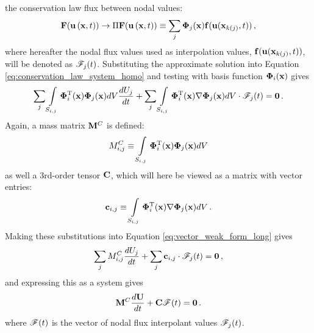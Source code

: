 the conservation law flux between nodal values:
\begin{equation}
  \consfluxvector(\vectorsolution\xt) \rightarrow
  \Pi\consfluxvector(\vectorsolution\xt) 
    \equiv \sumj\vectortestfunction_j(\x)\mathbf{\consfluxletter}
      (\vectorsolution(\x_{\nodeindex(j)},\timevalue))
  \eqc
\end{equation}
where hereafter the nodal flux values used as interpolation values,
$\mathbf{f}(\mathbf{u}(\mathbf{x}_{k(j)},t))$,
will be denoted as $\mathscr{F}_j(t)$.
Substituting the approximate
solution into Equation \eqref{eq:conservation_law_system_homo} and testing with basis
function $\mathbf{\Phi}_i(\mathbf{x})$ gives
\begin{equation}\label{eq:vector_weak_form_long}
   \sum\limits_j\int\limits_{S_{i,j}}\mathbf{\Phi}_i^{\text{T}}(\mathbf{x})\mathbf{\Phi}_j(\mathbf{x}) dV
     \frac{dU_j}{dt}
     + \sum\limits_j\int\limits_{S_{i,j}}\mathbf{\Phi}_i^{\text{T}}(\mathbf{x})\nabla\mathbf{\Phi}_j(\mathbf{x})
     dV\cdot\mathscr{F}_j(t) = \mathbf{0} \,.
\end{equation}
Again, a mass matrix $\mathbf{M}^C$ is defined:
\begin{equation}
  M^C_{i,j} \equiv
    \int\limits_{S_{i,j}}\mathbf{\Phi}_i^{\text{T}}(\mathbf{x})\mathbf{\Phi}_j(\mathbf{x}) dV
\end{equation}
as well a 3rd-order tensor $\gradientmatrix$, which will here be viewed as a
matrix with vector entries:
\begin{equation}
  \mathbf{c}_{i,j} \equiv
    \int\limits_{S_{i,j}}\mathbf{\Phi}_i^{\text{T}}(\mathbf{x})
      \nabla\mathbf{\Phi}_j(\mathbf{x}) dV
  \,.
\end{equation}
Making these substitutions into Equation \eqref{eq:vector_weak_form_long} gives
\begin{equation}\label{eq:vector_weak_form}
   \sum\limits_jM^C_{i,j}\frac{dU_j}{dt}
     + \sum\limits_j\mathbf{c}_{i,j}\cdot\mathscr{F}_j(t)
     = \mathbf{0} \,,
\end{equation}
and expressing this as a system gives
\begin{equation}
  \consistentmassmatrix\ddt{\solutionvector}
    + \gradientmatrix\consfluxinterpolant(\timevalue) = \mathbf{0}
  \eqp
\end{equation}
where $\mathscr{F}(t)$ is the vector of nodal flux interpolant values
$\mathscr{F}_j(t)$.
